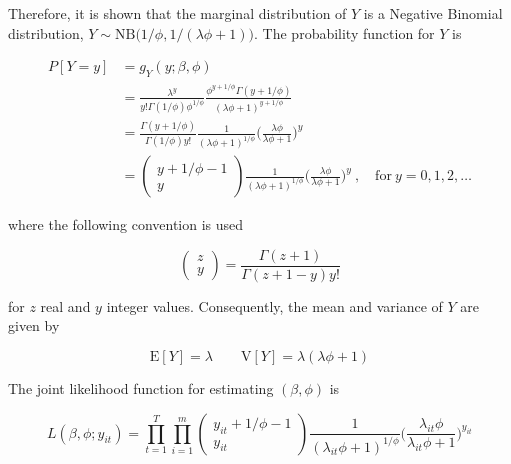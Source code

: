 \documentclass[preprint, 3p,
authoryear]{elsarticle} %
\begin{document}
Therefore, it is shown that the marginal distribution of \(Y\) is a
Negative Binomial distribution,
\(Y\sim\mathrm{NB}\big(1/\phi,1/(\lambda\phi+1)\big)\). The probability
function for \(Y\) is

\begin{equation} \label{eq:pdfMix}
  \begin{aligned}
    P[Y=y]&=g_{Y}(y; \beta, \phi) \\
    &=\frac{\lambda^{y}}{y!\Gamma(1/\phi)\phi^{1/\phi}}\frac{\phi^{y+1/\phi}\Gamma(y+1/\phi)}{(\lambda \phi + 1)^{y+1/\phi}} \\
    &=\frac{\Gamma(y+1/\phi)}{\Gamma(1/\phi)y!}\frac{1}{(\lambda\phi+1)^{1/\phi}}\bigg(\frac{\lambda\phi}{\lambda\phi+1}\bigg)^{y} \\
    &=\begin{pmatrix} y+1/\phi-1 \\ y \end{pmatrix} \frac{1}{(\lambda\phi+1)^{1/\phi}}\bigg(\frac{\lambda\phi}{\lambda\phi+1}\bigg)^{y} \ , \quad \mathrm{for} \ y = 0, 1, 2, \dots
  \end{aligned}
\end{equation}

where the following convention is used

\begin{equation}
  \begin{pmatrix} z\\y \end{pmatrix} = \frac{\Gamma(z+1)}{\Gamma(z+1-y)y!}
\end{equation}

for \(z\) real and \(y\) integer values. Consequently, the mean and
variance of \(Y\) are given by

\begin{equation}\label{eq:meanNB}
  \mathrm{E}[Y] = \lambda \qquad \mathrm{V}[Y] = \lambda (\lambda \phi + 1)
\end{equation}

The joint likelihood function for estimating \((\beta,\phi)\) is

\begin{equation}\label{eq:jnllPoisG}
  L( \beta, \phi; y_{it})=\prod_{t=1}^{T}\prod_{i=1}^{m} \begin{pmatrix} y_{it}+1/\phi-1 \\ y_{it} \end{pmatrix} \frac{1}{(\lambda_{it}\phi+1)^{1/\phi}}\bigg(\frac{\lambda_{it}\phi}{\lambda_{it}\phi+1}\bigg)^{y_{it}}
\end{equation}
\end{document}
